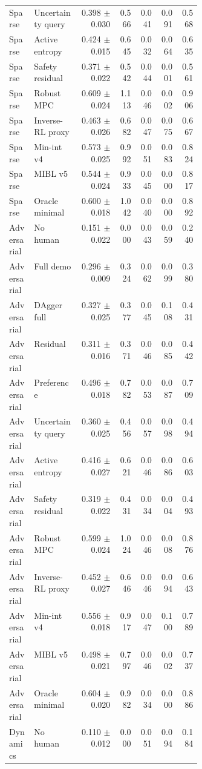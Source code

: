 \documentclass{article}
\begin{document}
\begin{center}
\begin{longtable}{p{0.13\linewidth}p{0.24\linewidth}rrrrr}
Sparse & Uncertainty query & 0.398 $\pm$ 0.030 & 0.566 & 0.041 & 0.091 & 0.568\\
Sparse & Active entropy & 0.424 $\pm$ 0.015 & 0.645 & 0.032 & 0.064 & 0.635\\
Sparse & Safety residual & 0.371 $\pm$ 0.022 & 0.542 & 0.044 & 0.001 & 0.561\\
Sparse & Robust MPC & 0.609 $\pm$ 0.024 & 1.113 & 0.046 & 0.002 & 0.906\\
Sparse & Inverse-RL proxy & 0.463 $\pm$ 0.026 & 0.682 & 0.047 & 0.075 & 0.667\\
Sparse & Min-int v4 & 0.573 $\pm$ 0.025 & 0.992 & 0.051 & 0.083 & 0.824\\
Sparse & MIBL v5 & 0.544 $\pm$ 0.024 & 0.933 & 0.045 & 0.000 & 0.817\\
Sparse & Oracle minimal & 0.600 $\pm$ 0.018 & 1.042 & 0.040 & 0.000 & 0.892\\
Adversarial & No human & 0.151 $\pm$ 0.022 & 0.000 & 0.043 & 0.059 & 0.240\\
Adversarial & Full demo & 0.296 $\pm$ 0.009 & 0.324 & 0.062 & 0.099 & 0.380\\
Adversarial & DAgger full & 0.327 $\pm$ 0.025 & 0.377 & 0.045 & 0.108 & 0.431\\
Adversarial & Residual & 0.311 $\pm$ 0.016 & 0.371 & 0.046 & 0.085 & 0.442\\
Adversarial & Preference & 0.496 $\pm$ 0.018 & 0.782 & 0.053 & 0.087 & 0.709\\
Adversarial & Uncertainty query & 0.360 $\pm$ 0.025 & 0.456 & 0.057 & 0.098 & 0.494\\
Adversarial & Active entropy & 0.416 $\pm$ 0.027 & 0.621 & 0.046 & 0.086 & 0.603\\
Adversarial & Safety residual & 0.319 $\pm$ 0.022 & 0.431 & 0.034 & 0.004 & 0.493\\
Adversarial & Robust MPC & 0.599 $\pm$ 0.024 & 1.024 & 0.046 & 0.008 & 0.876\\
Adversarial & Inverse-RL proxy & 0.452 $\pm$ 0.027 & 0.646 & 0.046 & 0.094 & 0.643\\
Adversarial & Min-int v4 & 0.556 $\pm$ 0.018 & 0.917 & 0.047 & 0.100 & 0.789\\
Adversarial & MIBL v5 & 0.498 $\pm$ 0.021 & 0.797 & 0.046 & 0.002 & 0.737\\
Adversarial & Oracle minimal & 0.604 $\pm$ 0.020 & 0.982 & 0.034 & 0.000 & 0.886\\
Dynamics & No human & 0.110 $\pm$ 0.012 & 0.000 & 0.051 & 0.094 & 0.184\\

\end{longtable}
\end{center}
\end{document}
